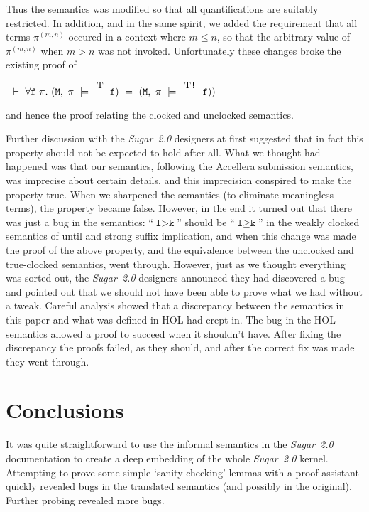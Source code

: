 \documentclass{llncs}
\newcommand{\T}{\texttt{\small\rm{T}}}
\newcommand{\sSem}[4]{(\tt{#1,~#2~\models^{\hspace*{-2.3mm}\raisebox{1mm}{\tt#3}}~#4})}
\newcommand{\fSem}[4]{(\tt{#1,~#2~\models^{\hspace*{-2.3mm}\raisebox{1mm}{\tt#3}}~#4})}
\newcommand{\pathSeg}[2]{#1^{#2}}
\newcommand\Sugar{{\it{Sugar~2.0}}\xspace}
\renewcommand{\t}[1]{\texttt{#1}}
\begin{document}
Thus the semantics was modified so that all quantifications are
suitably restricted.  In addition, and in the same spirit, we added
the requirement that all terms $\pathSeg{\pi}{(m,n)}$ occured in a
context where $m\leq n$, so that the arbitrary value of
$\pathSeg{\pi}{(m,n)}$ when $m>n$ was not invoked. Unfortunately
these changes broke the
existing proof of

\medskip

$~~\vdash~\forall{\t{f}}~\pi.~\fSem{M}{\pi}{\T}{f}~=~\sSem{M}{\pi}{\T\texttt{!}}{f})$

\medskip

and hence the proof relating the clocked and unclocked semantics.

Further discussion with the \Sugar designers at first suggested that
in fact this property should not be expected to hold after all.  What
we thought had happened was that our semantics, following the
Accellera submission semantics, was imprecise about certain details,
and this imprecision conspired to make the property true.  When we
sharpened the semantics (to eliminate meaningless terms), the property
became false. However, in the end it turned out that there was just a
bug in the semantics: ``$\t{l}>\t{k}$'' should be ``$\t{l}\geq\t{k}$''
in the weakly clocked semantics of until and strong suffix
implication, and when this change was made the proof of the above
property, and the equivalence between the unclocked and true-clocked
semantics, went through. However, just as we thought everything was
sorted out, the \Sugar designers announced they had discovered a bug
and pointed out that we should not have been able to prove what we had
without a tweak.  Careful analysis showed that a discrepancy between
the semantics in this paper and what was defined in HOL had crept
in. The bug in the HOL semantics allowed a proof to succeed when it
shouldn't have. After fixing the discrepancy the proofs failed, as
they should, and after the correct fix was made they went through.

\section{Conclusions}

It was quite straightforward to use the informal semantics in the
\Sugar documentation to create a deep embedding of the whole \Sugar
kernel.  Attempting to prove some simple `sanity checking' lemmas with
a proof assistant quickly revealed bugs in the translated semantics (and
possibly in the original). Further probing revealed more bugs.
\end{document}
